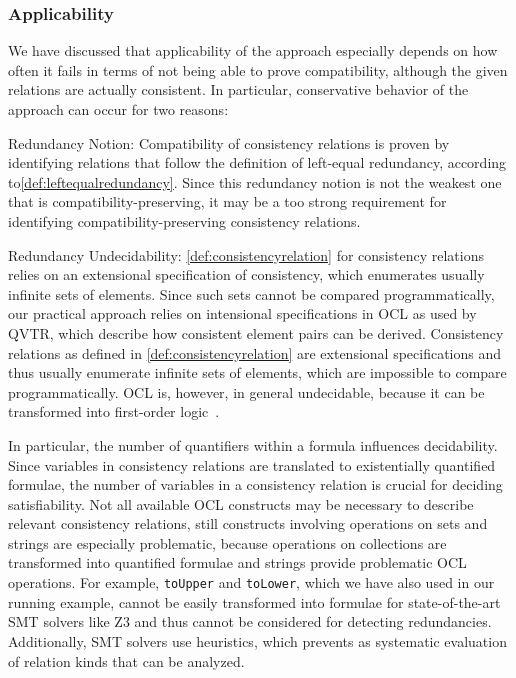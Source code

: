 \subsubsection{Applicability}

We have discussed that applicability of the approach especially depends on how often it fails in terms of not being able to prove compatibility, although the given relations are actually consistent.
In particular, conservative behavior of the approach can occur for two reasons:
\begin{properdescription}
    \item[Redundancy Notion:] Compatibility of consistency relations is proven by identifying relations that follow the definition of left-equal redundancy, according to\autoref{def:leftequalredundancy}. Since this redundancy notion is not the weakest one that is compatibility-preserving, it may be a too strong requirement for identifying compatibility-preserving consistency relations.
    \item[Redundancy Undecidability:] \autoref{def:consistencyrelation} for consistency relations relies on an extensional specification of consistency, which enumerates usually infinite sets of elements.
    Since such sets cannot be compared programmatically, our practical approach relies on intensional specifications in \gls{OCL} as used by \gls{QVTR}, which describe how consistent element pairs can be derived.
    Consistency relations as defined in \autoref{def:consistencyrelation} are extensional specifications and thus usually enumerate infinite sets of elements, which are impossible to compare programmatically.
    OCL is, however, in general undecidable, because it can be transformed into first-order logic~\cite{beckert2002ocltranslation}.
\end{properdescription}

In particular, the number of quantifiers within a formula influences decidability.
Since variables in consistency relations are translated to existentially quantified formulae, the number of variables in a consistency relation is crucial for deciding satisfiability.
Not all available \gls{OCL} constructs may be necessary to describe relevant consistency relations, still constructs involving operations on sets and strings are especially problematic, because operations on collections are transformed into quantified formulae and strings provide problematic \gls{OCL} operations.
For example, \texttt{toUpper} and \texttt{toLower}, which we have also used in our running example, cannot be easily transformed into formulae for state-of-the-art \gls{SMT} solvers like Z3 and thus cannot be considered for detecting redundancies.
Additionally, \gls{SMT} solvers use heuristics, which prevents as systematic evaluation of relation kinds that can be analyzed.

